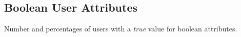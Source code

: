 \subsection{Boolean User Attributes}
Number and percentages of users with a \textit{true} value for boolean attributes.

